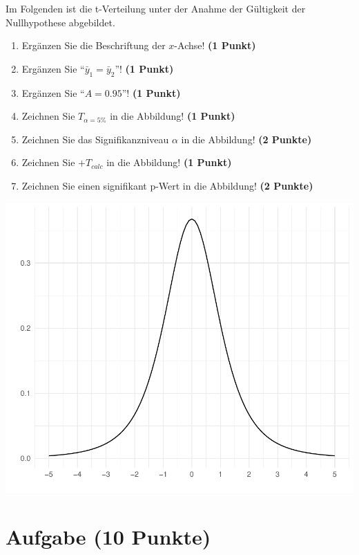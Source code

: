 \documentclass[a4paper, 9pt]{scrartcl}\usepackage[]{graphicx}\usepackage[]{xcolor}
\makeatletter
\def\maxwidth{ %
  \ifdim\Gin@nat@width>\linewidth
    \linewidth
  \else
    \Gin@nat@width
  \fi
}
\makeatother
\begin{document}
Im Folgenden ist die t-Verteilung unter der Anahme der G{\"u}ltigkeit der
Nullhypothese abgebildet. 

\begin{enumerate}
\item Erg{\"a}nzen Sie die Beschriftung der $x$-Achse! \textbf{(1 Punkt)}
\item Erg{\"a}nzen Sie "`$\bar{y}_1 = \bar{y}_2$"'! \textbf{(1 Punkt)} 
\item Erg{\"a}nzen Sie "`$A = 0.95$"'! \textbf{(1 Punkt)}
\item Zeichnen Sie $T_{\alpha=5\%}$ in die Abbildung! \textbf{(1 Punkt)} 
\item Zeichnen Sie das Signifikanzniveau $\alpha$ in die Abbildung! \textbf{(2 Punkte)} 
\item Zeichnen Sie $+T_{calc}$ in die Abbildung! \textbf{(1
    Punkt)}
\item Zeichnen Sie einen signifikant p-Wert in die Abbildung! \textbf{(2 Punkte)}   
\end{enumerate}



{\centering \includegraphics[width=\maxwidth]{img/statistisches-testen-3-1} 

}


 
\clearpage

\section{Aufgabe \hfill (10 Punkte)}
\end{document}

